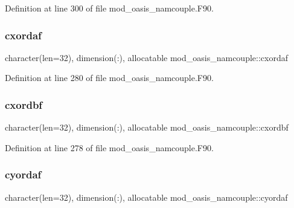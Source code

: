 Definition at line 300 of file mod\+\_\+oasis\+\_\+namcouple.\+F90.

\mbox{\label{namespacemod__oasis__namcouple_a5d93e0a5d832f73e9cc9d811d82342a0}} 
\subsubsection{\texorpdfstring{cxordaf}{cxordaf}}
{\footnotesize\ttfamily character(len=32), dimension(\+:), allocatable mod\+\_\+oasis\+\_\+namcouple\+::cxordaf\hspace{0.3cm}{\ttfamily [private]}}



Definition at line 280 of file mod\+\_\+oasis\+\_\+namcouple.\+F90.

\mbox{\label{namespacemod__oasis__namcouple_a047e7be9411842edfe8326ba22d3e92d}} 
\subsubsection{\texorpdfstring{cxordbf}{cxordbf}}
{\footnotesize\ttfamily character(len=32), dimension(\+:), allocatable mod\+\_\+oasis\+\_\+namcouple\+::cxordbf\hspace{0.3cm}{\ttfamily [private]}}



Definition at line 278 of file mod\+\_\+oasis\+\_\+namcouple.\+F90.

\mbox{\label{namespacemod__oasis__namcouple_a6af7c46f2c920cf3a64eaa879e193351}} 
\subsubsection{\texorpdfstring{cyordaf}{cyordaf}}
{\footnotesize\ttfamily character(len=32), dimension(\+:), allocatable mod\+\_\+oasis\+\_\+namcouple\+::cyordaf\hspace{0.3cm}{\ttfamily [private]}}



